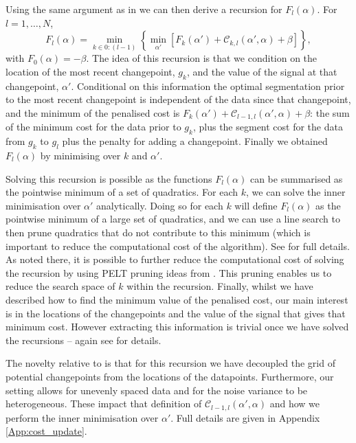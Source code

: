 \documentclass[article]{jss}
\begin{document}
Using the same argument as in \cite{fearnhead2019detecting} we can then derive a recursion for $F_l(\alpha)$. For $l=1,\ldots,N$,
\[
F_l(\alpha)= \min_{k \in 0:(l-1)} \left\{
\min_{\alpha'} \left[
F_{k}(\alpha')+\mathcal{C}_{k,l}(\alpha',\alpha) +\beta
\right]
\right\},
\]
with $F_0(\alpha)= -\beta$. The idea of this recursion is that we condition on the location of the most recent changepoint, $g_k$, and the value of the signal at that changepoint, $\alpha'$. Conditional on this information the optimal segmentation prior to the most recent changepoint is independent of the data since that changepoint, and the minimum of the penalised cost is $F_{k}(\alpha')+\mathcal{C}_{l-1,l}(\alpha',\alpha) +\beta$: the sum of the minimum cost for the data prior to $g_k$, plus the segment cost for the data from $g_k$ to $g_l$ plus the penalty for adding a changepoint. Finally we obtained $F_l(\alpha)$ by minimising over $k$ and $\alpha'$.

Solving this recursion is possible as the functions $F_l(\alpha)$ can be summarised as the pointwise minimum of a set of quadratics. For each $k$, we can solve the inner minimisation over $\alpha'$ analytically. Doing so for each $k$ will define $F_l(\alpha)$ as the pointwise minimum of a large set of quadratics, and we can use a line search to then prune quadratics that do not contribute to this minimum (which is important to reduce the computational cost of the algorithm). See \cite{fearnhead2019detecting} for full details. As noted there, it is possible to further reduce the computational cost of solving the recursion by using PELT pruning ideas from \cite{killick2012optimal}. This pruning enables us to reduce the search space of $k$ within the recursion. Finally, whilst we have described how to find the minimum value of the penalised cost, our main interest is in the locations of the changepoints and the value of the signal that gives that minimum cost. However extracting this information is trivial once we have solved the recursions -- again see \cite{fearnhead2019detecting} for details.

The novelty relative to \cite{fearnhead2019detecting} is that for this recursion we have decoupled the grid of potential changepoints from the locations of the datapoints. Furthermore, our setting allows for unevenly spaced data and for the noise variance to be heterogeneous. These impact that definition of $\mathcal{C}_{l-1,l}(\alpha',\alpha)$ and how we perform the inner minimisation over $\alpha'$. Full details are given in Appendix \ref{App:cost_update}.
\end{document}
